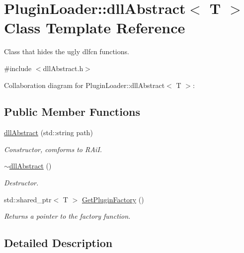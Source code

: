 \hypertarget{classPluginLoader_1_1dllAbstract}{}\section{Plugin\+Loader\+::dll\+Abstract$<$ T $>$ Class Template Reference}
\label{classPluginLoader_1_1dllAbstract}


Class that hides the ugly dlfcn functions.  




{\ttfamily \#include $<$dll\+Abstract.\+h$>$}



Collaboration diagram for Plugin\+Loader\+::dll\+Abstract$<$ T $>$\+:
\subsection*{Public Member Functions}
\begin{DoxyCompactItemize}
\item 
\mbox{\hyperlink{classPluginLoader_1_1dllAbstract_a2d525fbaf23c88ac0bfbc5321a09ef8d}{dll\+Abstract}} (std\+::string path)
\begin{DoxyCompactList}\small\item\em Constructor, comforms to R\+AiI. \end{DoxyCompactList}\item 
\mbox{\label{classPluginLoader_1_1dllAbstract_a1d7bde106c08fd2613787908a4d026c3}} 
\mbox{\hyperlink{classPluginLoader_1_1dllAbstract_a1d7bde106c08fd2613787908a4d026c3}{$\sim$dll\+Abstract}} ()
\begin{DoxyCompactList}\small\item\em Destructor. \end{DoxyCompactList}\item 
std\+::shared\+\_\+ptr$<$ T $>$ \mbox{\hyperlink{classPluginLoader_1_1dllAbstract_a1560b7381d7c034642245022479f21e7}{Get\+Plugin\+Factory}} ()
\begin{DoxyCompactList}\small\item\em Returns a pointer to the factory function. \end{DoxyCompactList}\end{DoxyCompactItemize}


\subsection{Detailed Description}
